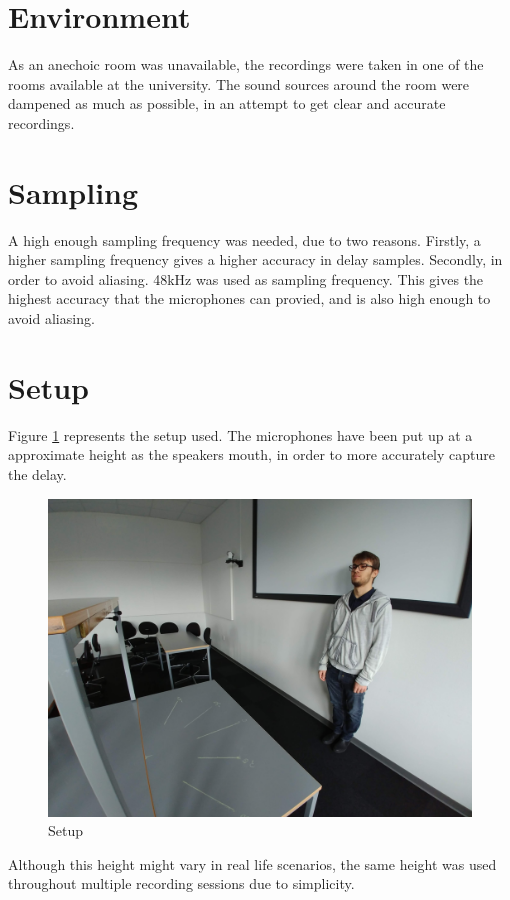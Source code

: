 \section{Environment}
As an anechoic room was unavailable, the recordings were taken in one of the rooms available at the university. 
The sound sources around the room were dampened as much as possible, in an attempt to get clear and accurate 
recordings.
\section{Sampling} 
A high enough sampling frequency was needed, due to two reasons. Firstly, a higher sampling frequency
gives a higher accuracy in delay samples. Secondly, in order to avoid aliasing. 48kHz was used
as sampling frequency. This gives the highest accuracy that the microphones can provied, and is also
high enough to avoid aliasing.
\newpage
\section{Setup}
Figure \ref{fig:RanzvanRecSetup} represents the setup used. The microphones have been put up at a
approximate height as the speakers mouth, in order to more accurately capture the delay.

\begin{figure}[htp]
	\centering
	\includegraphics[width=\textwidth]{Illustrations/razvanWithSetup.jpg}
	\caption{Setup}
	\label{fig:RanzvanRecSetup}
\end{figure}

Although this height might vary in real life scenarios, the same height was used throughout multiple recording
sessions due to simplicity.

